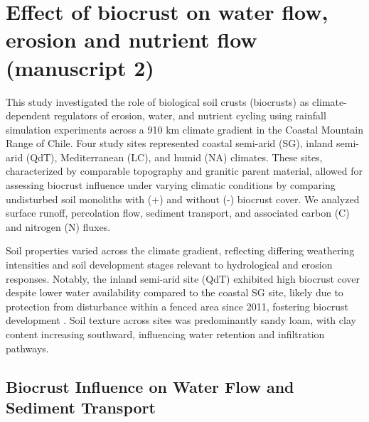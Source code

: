 \section{Effect of biocrust on water flow, erosion and nutrient flow (manuscript 2)}
\label{sec:BiocrustOnFlows}

This study investigated the role of biological soil crusts (biocrusts) as climate-dependent regulators of erosion, water, and nutrient cycling using rainfall simulation experiments across a 910 km climate gradient in the Coastal Mountain Range of Chile. Four study sites represented coastal semi-arid (SG), inland semi-arid (QdT), Mediterranean (LC), and humid (NA) climates. These sites, characterized by comparable topography and granitic parent material, allowed for assessing biocrust influence under varying climatic conditions by comparing undisturbed soil monoliths with (+) and without (-) biocrust cover. We analyzed surface runoff, percolation flow, sediment transport, and associated carbon (C) and nitrogen (N) fluxes.

Soil properties varied across the climate gradient, reflecting differing weathering intensities and soil development stages relevant to hydrological and erosion responses. Notably, the inland semi-arid site (QdT) exhibited high biocrust cover despite lower water availability compared to the coastal SG site, likely due to protection from disturbance within a fenced area since 2011, fostering biocrust development \citep{Büdel2016}. Soil texture across sites was predominantly sandy loam, with clay content increasing southward, influencing water retention and infiltration pathways.

\subsection{Biocrust Influence on Water Flow and Sediment Transport}
\label{sec:BiocrustOnWaterSesimentsFlows}

